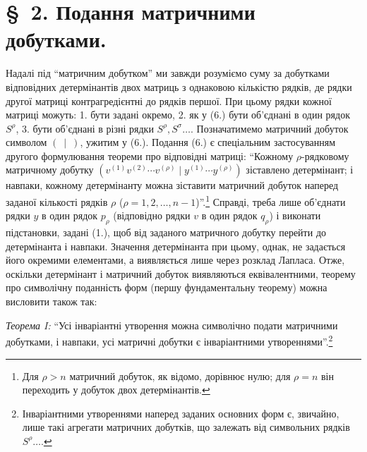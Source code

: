 \documentclass[11pt]{article}
\begin{document}
\section*{\S\ 2. Подання матричними добутками.}

Надалі під ``матричним добутком'' ми завжди розуміємо суму за добутками відповідних детермінантів двох матриць з однаковою кількістю рядків, де рядки другої матриці контрагредієнтні до рядків першої. При цьому рядки кожної матриці можуть: 1. бути задані окремо, 2. як у (6.) бути об'єднані в один рядок $S^\rho$, 3. бути об'єднані в різні рядки $S^\rho,S^\sigma\ldots$. Позначатимемо матричний добуток символом $(\ \mid\ )$, ужитим у (6.). Подання (6.) є спеціальним застосуванням другого формулювання теореми про відповідні матриці: ``Кожному $\rho$-рядковому матричному добутку $(v^{(1)}v^{(2)}\cdots v^{(\rho)}\mid y^{(1)}\cdots y^{(\rho)})$ зіставлено детермінант; і навпаки, кожному детермінанту можна зіставити матричний добуток наперед заданої кількості рядків $\rho$ ($\rho=1,2,\ldots,n-1$)''.\footnote{Для $\rho>n$ матричний добуток, як відомо, дорівнює нулю; для $\rho=n$ він переходить у добуток двох детермінантів.} Справді, треба лише об'єднати рядки $y$ в один рядок $p_\rho$ (відповідно рядки $v$ в один рядок $q_\rho$) і виконати підстановки, задані (1.), щоб від заданого матричного добутку перейти до детермінанта і навпаки. Значення детермінанта при цьому, однак, не задається його окремими елементами, а виявляється лише через розклад Лапласа. Отже, оскільки детермінант і матричний добуток виявляються еквівалентними, теорему про символічну поданність форм (першу фундаментальну теорему) можна висловити також так:

\emph{Теорема I:} ``Усі інваріантні утворення можна символічно подати матричними добутками, і навпаки, усі матричні добутки є інваріантними утвореннями''.\footnote{Інваріантними утвореннями наперед заданих основних форм є, звичайно, лише такі агрегати матричних добутків, що залежать від символьних рядків $S^\rho\ldots$.}
\end{document}
